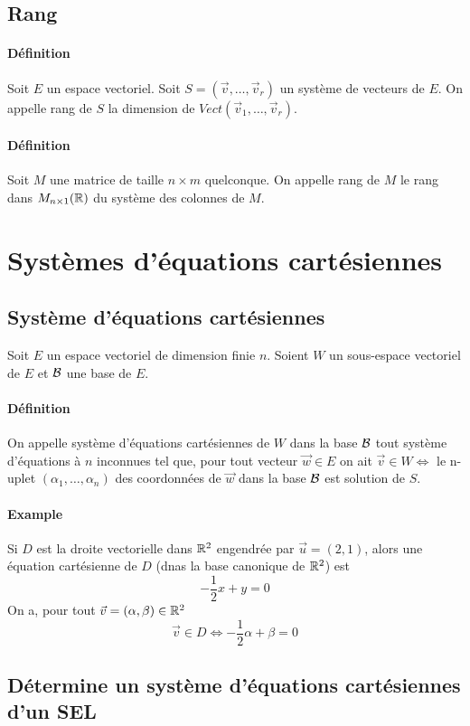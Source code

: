 %
\subsection{Rang}
%
\paragraph{Définition} Soit $E$ un espace vectoriel. Soit $S = (\vec{v}, \ldots, \vec{v}_r)$ un système de vecteurs de $E$. On appelle rang de $S$ la dimension de $Vect(\vec{v}_1, \ldots, \vec{v}_r)$.

\paragraph{Définition} Soit $M$ une matrice de taille $n\times m$ quelconque. On appelle rang de $M$ le rang dans $M_{n\times 1}(\mathbb{R})$ du système des colonnes de $M$.

%
%
\section{Systèmes d'équations cartésiennes} 
%
%

%
\subsection{Système d'équations cartésiennes}
%
Soit $E$ un espace vectoriel de dimension finie $n$. Soient $W$ un sous-espace vectoriel de $E$ et $\mathcal{B}$ une base de $E$.
\paragraph{Définition} On appelle système d'équations cartésiennes de $W$ dans la base $\mathcal{B}$ tout système d'équations à $n$ inconnues tel que, pour tout vecteur $\vec{w} \in E$ on ait $\vec{v} \in W \Leftrightarrow$ le n-uplet $(\alpha_1, \ldots, \alpha_n)$ des coordonnées de $\vec{w}$ dans la base $\mathcal{B}$ est solution de $S$.

\paragraph{Example} Si $D$ est la droite vectorielle dans $\mathbb{R}^2$ engendrée par $\vec{u} = (2, 1)$, alors une équation cartésienne de $D$ (dnas la base canonique de $\mathbb{R}^2$) est
$$ - \frac{1}{2} x + y = 0$$
On a, pour tout $\vec{v} = (\alpha, \beta) \in \mathbb{R}^2$ 
$$\vec{v} \in D \Leftrightarrow -\frac{1}{2} \alpha + \beta = 0$$

%
\subsection{Détermine un système d'équations cartésiennes d'un SEL}
%
